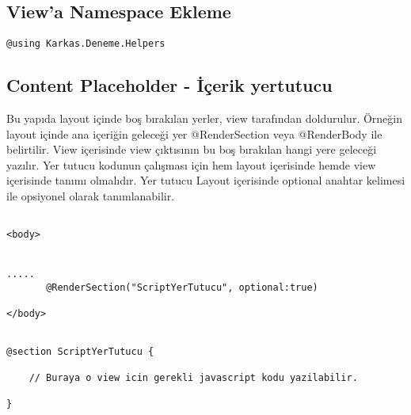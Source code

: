 \documentclass[10pt,a4paper]{article}
\begin{document}
\subsection{View'a Namespace Ekleme}
\begin{lstlisting}[label=code-ViewNamespace,caption=View Namespace Ekleme]
@using Karkas.Deneme.Helpers
\end{lstlisting}



\subsection{Content Placeholder - İçerik yertutucu }

Bu yapıda layout içinde boş bırakılan yerler, view tarafından doldurulur.
Örneğin layout içinde ana içeriğin geleceği yer @RenderSection veya @RenderBody
ile belirtilir.
View içerisinde view çıktısının bu boş bırakılan hangi yere geleceği yazılır.
Yer tutucu kodunun çalışması için hem layout içerisinde hemde view içerisinde tanımı olmalıdır.
Yer tutucu Layout içerisinde optional anahtar kelimesi ile opsiyonel olarak tanımlanabilir.



\begin{lstlisting}[label=code-ContentPlaceHolderLayout,caption=İçerik yertutucu - Layout ]

<body>


.....
       @RenderSection("ScriptYerTutucu", optional:true)

</body>

\end{lstlisting}


\begin{lstlisting}[label=code-ContentPlaceHolderView,caption=İçerik yertutucu - View ]

@section ScriptYerTutucu {

	// Buraya o view icin gerekli javascript kodu yazilabilir.
	
}

\end{lstlisting}




% 

\end{document}
